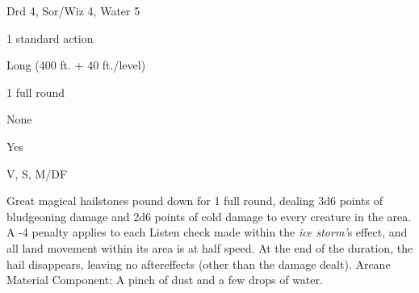 
\begin{description*}
\item[Level:] Drd 4, Sor/Wiz 4, Water 5
\item[Casting Time:] 1 standard action
\item[Range:] Long (400 ft. + 40 ft./level)
\item[Duration:] 1 full round
\item[Saving Throw:] None
\item[Spell Resistance:] Yes
\item[Components:] V, S, M/DF
\end{description*}

Great magical hailstones pound down for 1 full round, dealing 3d6 points of bludgeoning
damage and 2d6 points of cold damage to every creature in the area. A -4 penalty
applies to each Listen check made within the \textit{ice storm'}s effect, and all
land movement within its area is at half speed. At the end of the duration, the
hail disappears, leaving no aftereffects (other than the damage dealt).
Arcane Material Component: A pinch of dust and a few drops of water.